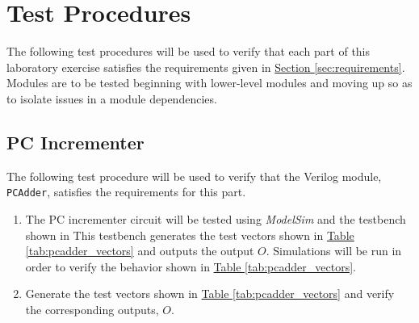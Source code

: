 \section{Test Procedures} %
\label{sec:test_procedures}

The following test procedures will be used to verify that each part of this laboratory exercise satisfies the requirements given in \hyperref[sec:requirements]{Section \ref*{sec:requirements}}.
Modules are to be tested beginning with lower-level modules and moving up so as to isolate issues in a module dependencies.

\subsection{PC Incrementer} %
\label{sub:pc_incrementer}

The following test procedure will be used to verify that the Verilog module, \verb|PCAdder|, satisfies the requirements for this part.

\begin{enumerate}
    \item The PC incrementer circuit will be tested using \emph{ModelSim} and the testbench shown in %
    This testbench generates the test vectors shown in \hyperref[tab:pcadder_vectors]{Table \ref*{tab:pcadder_vectors}} and outputs the output $O$.
    Simulations will be run in order to verify the behavior shown in \hyperref[tab:pcadder_vectors]{Table \ref*{tab:pcadder_vectors}}.
    \item Generate the test vectors shown in \hyperref[tab:pcadder_vectors]{Table \ref*{tab:pcadder_vectors}} and verify the corresponding outputs, $O$.
\end{enumerate}

